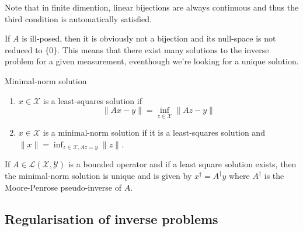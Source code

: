 \begin{remark}
    Note that in finite dimention, linear bijections are always continuous and thus the third condition is automatically satisfied.
\end{remark}

If $A$ is ill-posed, then it is obviously not a bijection and its null-space is not reduced to $\{0\}$.
This means that there exist many solutions to the inverse problem for a given measurement, eventhough we're looking for a unique solution.


\begin{definition}{Minimal-norm solution}
    \begin{enumerate}
    \item $x \in \mathcal{X}$ is a least-squares solution if 
    \begin{equation*}
        \| Ax - y \| = \inf_{z \in \mathcal{X}} \| Az - y \|
    \end{equation*}
    \item $x \in \mathcal{X}$ is a minimal-norm solution if it is a least-squares solution and $\| x \| = \inf_{z \in \mathcal{X}, Az = y} \| z \|$.
    \end{enumerate}
\end{definition}




\begin{proposition}
    If $A \in \mathcal{L}(\mathcal{X}, \mathcal{Y})$ is a bounded operator and if a least square solution exists, then the minimal-norm solution is unique and is given by $ x ^\dagger = A^\dagger y$ where $A^\dagger$ is the Moore-Penrose pseudo-inverse of $A$. \cite{sherry2025part}
\end{proposition}

\subsection{Regularisation of inverse problems}

